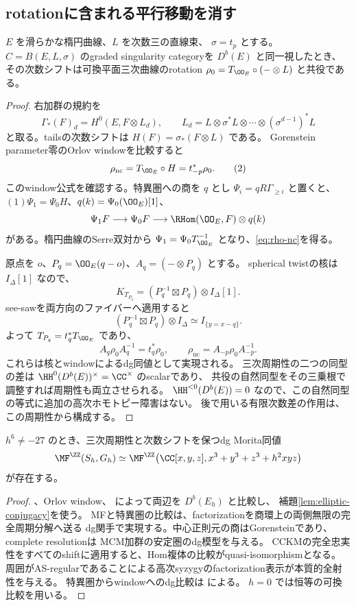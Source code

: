 \subsection{rotationに含まれる平行移動を消す}

\begin{lemma}\label{lem:elliptic-conjugacy}
 \(E\) を滑らかな楕円曲線、\(L\) を次数三の直線束、
 \(\sigma=t_p\) とする。
 \(C=B(E,L,\sigma)\) のgraded singularity categoryを \(D^b(E)\) と同一視したとき、
 その次数シフトは可換平面三次曲線のrotation
 \(\rho_0=T_{\OO_E}\circ(-\otimes L)\) と共役である。
\end{lemma}
\begin{proof}
 右加群の規約を
 \[
 \Gamma_*(F)_d=H^0(E,F\otimes L_d),\qquad
 L_d=L\otimes\sigma^*L\otimes\cdots\otimes(\sigma^{d-1})^*L
 \]
 と取る。tailsの次数シフトは \(H(F)=\sigma_*(F\otimes L)\) である。
 Gorenstein parameter零のOrlov windowを比較すると
 \[
 \rho_{\mathrm{nc}}=T_{\OO_E}\circ H=t_{-p}^*\rho_0.
 \tag{2}\label{eq:rho-nc}
 \]
 このwindow公式を確認する。特異圏への商を \(q\) とし
 \(\Psi_i=qR\Gamma_{\ge i}\) と置くと、
 \((1)\Psi_1=\Psi_0H\)、\(q(k)=\Psi_0(\OO_E)[1]\)、
 \[
 \Psi_1F\longrightarrow\Psi_0F
 \longrightarrow\RHom(\OO_E,F)\otimes q(k)
 \]
 がある。楕円曲線のSerre双対から
 \(\Psi_1=\Psi_0T_{\OO_E}^{-1}\) となり、\eqref{eq:rho-nc}を得る。

 原点を \(o\)、\(P_q=\OO_E(q-o)\)、\(A_q=(-\otimes P_q)\) とする。
 spherical twistの核は \(I_\Delta[1]\) なので、
 \[
 K_{T_{P_q}}=(P_q^{-1}\boxtimes P_q)\otimes I_\Delta[1].
 \]
 see-sawを両方向のファイバーへ適用すると
 \[
 (P_q^{-1}\boxtimes P_q)\otimes I_\Delta
 \simeq I_{\{y=x-q\}}.
 \]
 よって \(T_{P_q}=t_q^*T_{\OO_E}\) であり、
 \[
 A_q\rho_0A_q^{-1}=t_q^*\rho_0,\qquad
 \rho_{\mathrm{nc}}=A_{-p}\rho_0A_{-p}^{-1}.
 \tag{3}\label{eq:conjugacy}
 \]
 これらは核とwindowによるdg同値として実現される。
 三次周期性の二つの同型の差は \(\HH^0(D^b(E))^\times=\CC^\times\) のscalarであり、
 共役の自然同型をその三乗根で調整すれば周期性も両立させられる。
 \(\HH^{<0}(D^b(E))=0\) なので、この自然同型の等式に追加の高次ホモトピー障害はない。
 後で用いる有限次数差の作用は、この周期性から構成する。
\end{proof}

\begin{corollary}\label{cor:block}
 \(h^6\ne-27\) のとき、三次周期性と次数シフトを保つdg Morita同値
 \[
 \MF^{\ZZ}(S_h,G_h)
 \simeq
 \MF^{\ZZ}\bigl(\CC[x,y,z],x^3+y^3+z^3+h^2xyz\bigr)
 \]
 が存在する。
\end{corollary}
\begin{proof}
 \cite[Theorem 3.6.2]{EG}、Orlov window、
 \cite[Theorem 5.8]{CCKM}によって両辺を \(D^b(E_h)\) と比較し、
 補題\ref{lem:elliptic-conjugacy}を使う。
 MFと特異圏の比較は、factorizationを商環上の両側無限の完全周期分解へ送る
 dg関手で実現する。中心正則元の商はGorensteinであり、complete resolutionは
 MCM加群の安定圏のdg模型を与える。
 CCKMの完全忠実性をすべてのshiftに適用すると、Hom複体の比較がquasi-isomorphismとなる。
 周囲がAS-regularであることによる高次syzygyのfactorization表示が本質的全射性を与える。
 特異圏からwindowへのdg比較は \cite[Section 5, Theorem 5.8]{CT} による。
 \(h=0\) では恒等の可換比較を用いる。
\end{proof}

